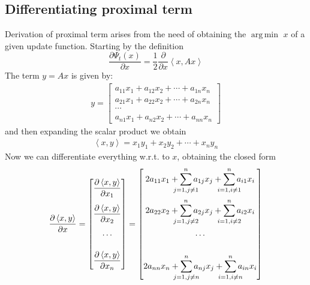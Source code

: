 \documentclass[notitlepage]{article}
\DeclareMathOperator*{\argmin}{arg\,min}
\begin{document}
\subsection{Differentiating proximal term}
Derivation of proximal term arises from the need of obtaining the $\argmin$ $x$ of a given update function. Starting by the definition
\[
  \frac{\partial \Psi_t(x)}{\partial x} = \frac{1}{2} \frac{\partial}{\partial x} \left\langle x, A x \right\rangle  
\]
The term $y = A x$ is given by:
\begin{align*}
  y = 
  \begin{bmatrix}
    a_{11}x_1 + a_{12}x_2 + \cdots + a_{1n}x_n \\[2ex]
    a_{21}x_1 + a_{22}x_2 + \cdots + a_{2n}x_n \\[2ex]
    \cdots \\
    a_{n1}x_1 + a_{n2}x_2 + \cdots + a_{nn}x_n 
  \end{bmatrix}
\end{align*}
and then expanding the scalar product we obtain
\begin{align*}
  \left\langle x,y \right\rangle = x_1 y_1 + x_2 y_2 + \cdots + x_n y_n
\end{align*}
Now we can differentiate everything w.r.t. to $x$, obtaining the closed form
\begin{align*}
  \frac{\partial \left\langle x,y \right\rangle}{\partial x} = 
  \begin{bmatrix}
    \dfrac{\partial \left\langle x,y \right\rangle}{\partial x_1} \\[3ex]
    \dfrac{\partial \left\langle x,y \right\rangle}{\partial x_2} \\[3ex]
    \cdots \\[3ex]
    \dfrac{\partial \left\langle x,y \right\rangle}{\partial x_n} 
  \end{bmatrix}
  = 
  \begin{bmatrix}
    2 a_{11}x_1 + \displaystyle \sum_{\mathclap{j=1, j \neq 1}}^n a_{1j} x_j + \sum_{\mathclap{i=1, i \neq 1}}^n a_{i1} x_i \\[4ex]
    2 a_{22}x_2 + \displaystyle \sum_{\mathclap{j=1, j \neq 2}}^n a_{2j} x_j + \sum_{\mathclap{i=1, i \neq 2}}^n a_{i2} x_i \\[4ex]
    \cdots \\[4ex]
    2 a_{nn}x_n + \displaystyle \sum_{\mathclap{j=1, j \neq n}}^n a_{nj} x_j + \sum_{\mathclap{i=1, i \neq n}}^n a_{in} x_i \\
  \end{bmatrix}
\end{align*}
\end{document}
